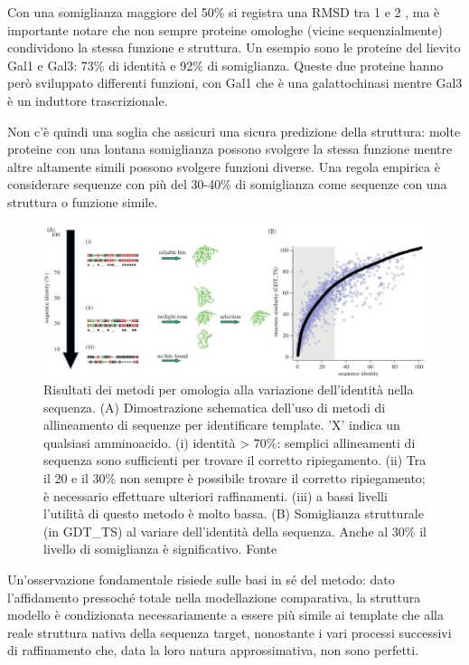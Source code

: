 {	Con una somiglianza maggiore del 50\% si registra una RMSD tra 1 e 2 \angstrom, ma è importante notare che non sempre proteine omologhe (vicine sequenzialmente) condividono la stessa funzione e struttura. Un esempio sono le proteine del lievito Gal1 e Gal3: 73\% di identità e 92\% di somiglianza. Queste due proteine hanno però sviluppato differenti funzioni, con Gal1 che è una galattochinasi mentre Gal3 è un induttore trascrizionale\supercite{platt2000insertion}.
	
	\par Non c'è quindi una soglia che assicuri una sicura predizione della struttura: molte proteine con una lontana somiglianza possono svolgere la stessa funzione mentre altre altamente simili possono svolgere funzioni diverse. Una regola empirica è considerare sequenze con più del 30-40\% di somiglianza come sequenze con una struttura o funzione simile.
	
	\begin{figure}[!htb]
		\centering
		\includegraphics[scale=1.2]{images/homology-grafico.jpg}
		\caption{Risultati dei metodi per omologia alla variazione dell'identità nella sequenza. (A) Dimostrazione schematica dell'uso di metodi di allineamento di sequenze per identificare template. 'X' indica un qualsiasi amminoacido. (i) identità > 70\%: semplici allineamenti di sequenza sono sufficienti per trovare il corretto ripiegamento. (ii) Tra il 20 e il 30\% non sempre è possibile trovare il corretto ripiegamento; è necessario effettuare ulteriori raffinamenti. (iii) a bassi livelli l'utilità di questo metodo è molto bassa. (B) Somiglianza strutturale (in GDT\_TS) al variare dell'identità della sequenza. Anche al 30\% il livello di somiglianza è significativo. Fonte\cite{joseph2014local}}
		\label{fig:omologia-grafico}
	\end{figure}
	
	\par Un'osservazione fondamentale risiede sulle basi in sé del metodo: dato l'affidamento pressoché totale nella modellazione comparativa, la struttura modello è condizionata necessariamente a essere più simile ai template che alla reale struttura nativa della sequenza target, nonostante i vari processi successivi di raffinamento che, data la loro natura approssimativa, non sono perfetti. 
	
}
